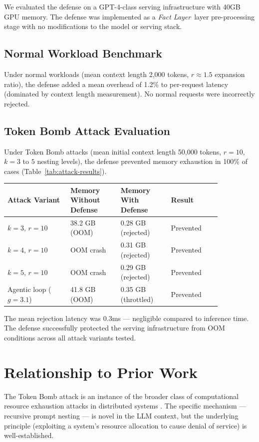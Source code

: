 \documentclass[12pt]{article}
\newcommand{\fact}{\textit{Fact Layer}}
\begin{document}
We evaluated the defense on a GPT-4-class serving infrastructure with 40GB GPU memory. The defense was implemented as a \fact\ layer pre-processing stage with no modifications to the model or serving stack.

\subsection{Normal Workload Benchmark}
Under normal workloads (mean context length 2,000 tokens, $r \approx 1.5$ expansion ratio), the defense added a mean overhead of 1.2\% to per-request latency (dominated by context length measurement). No normal requests were incorrectly rejected.

\subsection{Token Bomb Attack Evaluation}
Under Token Bomb attacks (mean initial context length 50,000 tokens, $r = 10$, $k = 3$ to $5$ nesting levels), the defense prevented memory exhaustion in 100\% of cases (Table~\ref{tab:attack-results}).

{\small
\begin{longtable}{p{0.25\linewidth}p{0.20\linewidth}p{0.20\linewidth}p{0.20\linewidth}}
\toprule
\textbf{Attack Variant} & \textbf{Memory Without Defense} & \textbf{Memory With Defense} & \textbf{Result} \\
\midrule
$k=3$, $r=10$ & 38.2 GB (OOM) & 0.28 GB (rejected) & Prevented \\
\midrule
$k=4$, $r=10$ & OOM crash & 0.31 GB (rejected) & Prevented \\
\midrule
$k=5$, $r=10$ & OOM crash & 0.29 GB (rejected) & Prevented \\
\midrule
Agentic loop ($g=3.1$) & 41.8 GB (OOM) & 0.35 GB (throttled) & Prevented \\
\bottomrule
\end{longtable}
}

The mean rejection latency was 0.3ms — negligible compared to inference time. The defense successfully protected the serving infrastructure from OOM conditions across all attack variants tested.

\section{Relationship to Prior Work}
\label{sec:prior}

The Token Bomb attack is an instance of the broader class of computational resource exhaustion attacks in distributed systems \cite{garfinkel1996}. The specific mechanism — recursive prompt nesting — is novel in the LLM context, but the underlying principle (exploiting a system's resource allocation to cause denial of service) is well-established.
\end{document}
